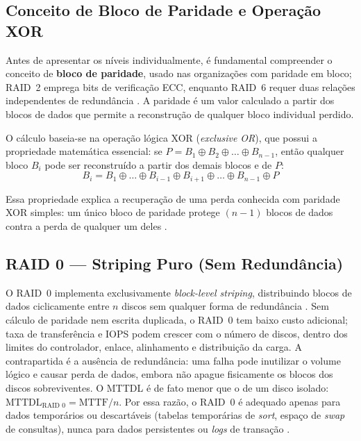 \documentclass[titlepage]{article}
\begin{document}
\subsection{Conceito de Bloco de Paridade e Operação XOR}
Antes de apresentar os níveis individualmente, é fundamental compreender o conceito de \textbf{bloco de paridade}, usado nas organizações com paridade em bloco; RAID~2 emprega bits de verificação ECC, enquanto RAID~6 requer duas relações independentes de redundância \cite{silberschatz2020}. A paridade é um valor calculado a partir dos blocos de dados que permite a reconstrução de qualquer bloco individual perdido.

O cálculo baseia-se na operação lógica XOR (\textit{exclusive OR}), que possui a propriedade matemática essencial: se $P = B_1 \oplus B_2 \oplus \ldots \oplus B_{n-1}$, então qualquer bloco $B_i$ pode ser reconstruído a partir dos demais blocos e de $P$:
\begin{equation}
    B_i = B_1 \oplus \ldots \oplus B_{i-1} \oplus B_{i+1} \oplus \ldots \oplus B_{n-1} \oplus P
    \label{eq:xor_recovery}
\end{equation}

Essa propriedade explica a recuperação de uma perda conhecida com paridade XOR simples: um único bloco de paridade protege $(n-1)$ blocos de dados contra a perda de qualquer um deles \cite{silberschatz2020}.

\subsection{RAID 0 --- Striping Puro (Sem Redundância)}
O RAID~0 implementa exclusivamente \textit{block-level striping}, distribuindo blocos de dados ciclicamente entre $n$ discos sem qualquer forma de redundância \cite{silberschatz2020}. Sem cálculo de paridade nem escrita duplicada, o RAID~0 tem baixo custo adicional; taxa de transferência e IOPS podem crescer com o número de discos, dentro dos limites do controlador, enlace, alinhamento e distribuição da carga. A contrapartida é a ausência de redundância: uma falha pode inutilizar o volume lógico e causar perda de dados, embora não apague fisicamente os blocos dos discos sobreviventes. O MTTDL é de fato menor que o de um disco isolado: $\text{MTTDL}_{\text{RAID 0}} = \text{MTTF}/n$. Por essa razão, o RAID~0 é adequado apenas para dados temporários ou descartáveis (tabelas temporárias de \textit{sort}, espaço de \textit{swap} de consultas), nunca para dados persistentes ou \textit{logs} de transação \cite{silberschatz2020}.
\end{document}
